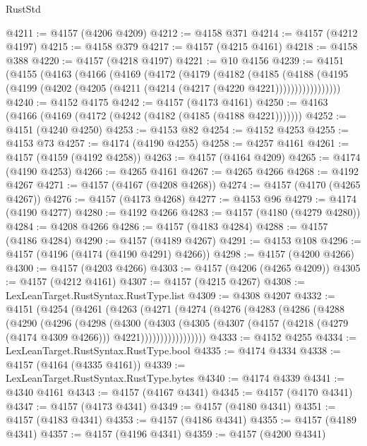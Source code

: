 \begin{lexlean}{RustStd}
\begin{coremodule}
@4211 := @4157 (@4206 @4209)
@4212 := @4158 @371
@4214 := @4157 (@4212 @4197)
@4215 := @4158 @379
@4217 := @4157 (@4215 @4161)
@4218 := @4158 @388
@4220 := @4157 (@4218 @4197)
@4221 := @10 @4156
@4239 := @4151
    (@4155
      (@4163
        (@4166
          (@4169
            (@4172
              (@4179
                (@4182
                  (@4185
                    (@4188
                      (@4195 (@4199 (@4202 (@4205 (@4211 (@4214 (@4217 (@4220 @4221)))))))))))))))))
@4240 := @4152 @4175
@4242 := @4157 (@4173 @4161)
@4250 := @4163 (@4166 (@4169 (@4172 (@4242 (@4182 (@4185 (@4188 @4221)))))))
@4252 := @4151 (@4240 @4250)
@4253 := @4153 @82
@4254 := @4152 @4253
@4255 := @4153 @73
@4257 := @4174 (@4190 @4255)
@4258 := @4257 @4161
@4261 := @4157 (@4159 (@4192 @4258))
@4263 := @4157 (@4164 @4209)
@4265 := @4174 (@4190 @4253)
@4266 := @4265 @4161
@4267 := @4265 @4266
@4268 := @4192 @4267
@4271 := @4157 (@4167 (@4208 @4268))
@4274 := @4157 (@4170 (@4265 @4267))
@4276 := @4157 (@4173 @4268)
@4277 := @4153 @96
@4279 := @4174 (@4190 @4277)
@4280 := @4192 @4266
@4283 := @4157 (@4180 (@4279 @4280))
@4284 := @4208 @4266
@4286 := @4157 (@4183 @4284)
@4288 := @4157 (@4186 @4284)
@4290 := @4157 (@4189 @4267)
@4291 := @4153 @108
@4296 := @4157 (@4196 (@4174 (@4190 @4291) @4266))
@4298 := @4157 (@4200 @4266)
@4300 := @4157 (@4203 @4266)
@4303 := @4157 (@4206 (@4265 @4209))
@4305 := @4157 (@4212 @4161)
@4307 := @4157 (@4215 @4267)
@4308 := LexLeanTarget.RustSyntax.RustType.list
@4309 := @4308 @4207
@4332 := @4151
    (@4254
      (@4261
        (@4263
          (@4271
            (@4274
              (@4276
                (@4283
                  (@4286
                    (@4288
                      (@4290
                        (@4296
                          (@4298
                            (@4300
                              (@4303
                                (@4305
                                  (@4307
                                    (@4157
                                      (@4218 (@4279 (@4174 @4309 @4266)))
                                      @4221)))))))))))))))))
@4333 := @4152 @4255
@4334 := LexLeanTarget.RustSyntax.RustType.bool
@4335 := @4174 @4334
@4338 := @4157 (@4164 (@4335 @4161))
@4339 := LexLeanTarget.RustSyntax.RustType.bytes
@4340 := @4174 @4339
@4341 := @4340 @4161
@4343 := @4157 (@4167 @4341)
@4345 := @4157 (@4170 @4341)
@4347 := @4157 (@4173 @4341)
@4349 := @4157 (@4180 @4341)
@4351 := @4157 (@4183 @4341)
@4353 := @4157 (@4186 @4341)
@4355 := @4157 (@4189 @4341)
@4357 := @4157 (@4196 @4341)
@4359 := @4157 (@4200 @4341)

\end{coremodule}
\end{lexlean}
